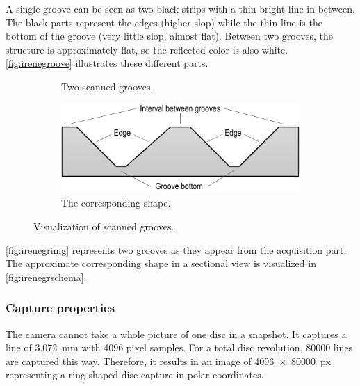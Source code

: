 A single groove can be seen as two black strips with a thin bright line in between. The black parts represent the edges (higher slop) while the thin line is the bottom of the groove (very little slop, almost flat). Between two grooves, the structure is approximately flat, so the reflected color is also white. \autoref{fig:irenegroove} illustrates these different parts.

\begin{figure}[!ht]
\centering
    \begin{subfigure}[t]{0.29\textwidth}
    \centering
    \caption{Two scanned grooves.}
    \label{fig:irenegrimg}
    \end{subfigure}
    \begin{subfigure}[t]{0.7\textwidth}
    \centering
    \includegraphics[width=9.5cm]{images/irene-grooves-schema}
    \caption{The corresponding shape.}
    \label{fig:irenegrschema}
    \end{subfigure}
    \caption{Visualization of scanned grooves.}
    \label{fig:irenegroove}
\end{figure}

\autoref{fig:irenegrimg} represents two grooves as they appear from the acquisition part. The approximate corresponding shape in a sectional view is visualized in \autoref{fig:irenegrschema}.

\subsubsection{Capture properties}

The camera cannot take a whole picture of one disc in a snapshot. It captures a line of \SI{3.072}{\milli\metre} with \num{4096} pixel samples. For a total disc revolution, \num{80000} lines are captured this way. Therefore, it results in an image of \SI[product-units=single]{4096x80000}{px} representing a ring-shaped disc capture in polar coordinates.

